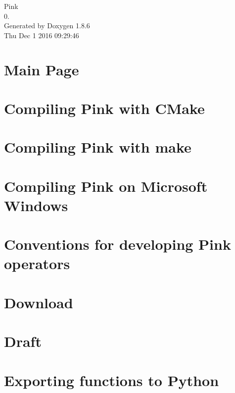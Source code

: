 \documentclass[twoside]{book}
\newcommand{\clearemptydoublepage}{%
  \newpage{\pagestyle{empty}\cleardoublepage}%
}
\begin{document}
\begin{titlepage}
\vspace*{7cm}
\begin{center}%
{\Large Pink \\[1ex]\large 0. }\\
\vspace*{1cm}
{\large Generated by Doxygen 1.8.6}\\
\vspace*{0.5cm}
{\small Thu Dec 1 2016 09:29:46}\\
\end{center}
\end{titlepage}
\clearemptydoublepage
\tableofcontents
\clearemptydoublepage
{}

\chapter{Main Page}
\label{index}
\chapter{Compiling Pink with C\-Make}
\label{compiling_cmake}

\chapter{Compiling Pink with make}
\label{compiling_make}

\chapter{Compiling Pink on Microsoft Windows}
\label{compiling_windows}

\chapter{Conventions for developing Pink operators}
\label{dev_conventions}

\chapter{Download}
\label{download}

\chapter{Draft}
\label{files_to_copy}

\chapter{Exporting functions to Python}
\label{python_export}

\end{document}
